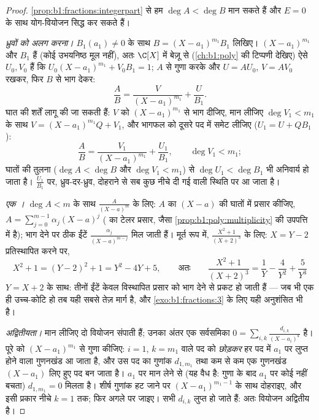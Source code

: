 \begin{proof}
\cref{prop:b1:fractions:integerpart} से हम $\deg A < \deg B$ मान सकते हैं और
$E = 0$ के साथ योग-वियोजन सिद्ध कर सकते हैं।

\emph{ध्रुवों को अलग करना।} $B_1(a_1) \neq 0$ के साथ $B = (X - a_1)^{m_1}
B_1$ लिखिए।  $(X-a_1)^{m_1}$ और $B_1$  हैं (कोई उभयनिष्ठ मूल
नहीं), अतः $\C[X]$ में बेज़ू से (\cref{ch:b1:poly} की टिप्पणी देखिए) ऐसे
$U_0, V_0$ हैं कि $U_0 (X-a_1)^{m_1} + V_0 B_1 = 1$; $A$ से गुणा करके और $U
= AU_0$, $V = AV_0$ रखकर, फिर $B$ से भाग देकर:
\[
\frac AB = \frac{V}{(X - a_1)^{m_1}} + \frac{U}{B_1} .
\]
घात की शर्तें लागू की जा सकती हैं: $V$ को $(X-a_1)^{m_1}$ से भाग दीजिए, मान
लीजिए $\deg V_1 < m_1$ के साथ $V = (X-a_1)^{m_1}Q + V_1$, और भागफल को दूसरे
पद में समेट लीजिए ($U_1 = U + QB_1$):
\[
\frac AB = \frac{V_1}{(X - a_1)^{m_1}} + \frac{U_1}{B_1},
\qquad \deg V_1 < m_1 ;
\]
घातों की तुलना ($\deg A < \deg B$ और $\deg V_1 < m_1$) से $\deg U_1 < \deg
B_1$ भी अनिवार्य हो जाता है। $\frac{U_1}{B_1}$ पर, ध्रुव-दर-ध्रुव, दोहराने
से सब कुछ नीचे दी गई  वाली स्थिति पर आ जाता है।

\emph{एक ।} $\deg A < m$ के साथ $\frac{A}{(X-a)^m}$ के लिए: $A$ का $(X
- a)$ की घातों में प्रसार कीजिए, $A = \sum_{j=0}^{m-1} \alpha_j (X - a)^j$
( का टेलर प्रसार, जैसा \cref{prop:b1:poly:multiplicity} की उपपत्ति में
है); भाग देने पर ठीक ईंटें $\frac{\alpha_j}{(X-a)^{m-j}}$ मिल जाती हैं।
मूर्त रूप में, $\frac{X^2 + 1}{(X+2)^3}$ के लिए: $X = Y - 2$ प्रतिस्थापित
करने पर,
\[
X^2 + 1 = (Y - 2)^2 + 1 = Y^2 - 4Y + 5 ,
\qquad\text{अतः}\qquad
\frac{X^2+1}{(X+2)^3} = \frac1{Y} - \frac4{Y^2} + \frac5{Y^3}
\]
$Y = X + 2$ के साथ: तीनों ईंटें केवल विस्थापित प्रसार को भाग देने से प्रकट
हो जाती हैं --- जब भी एक ही उच्च-कोटि  हो तब यही सबसे तेज़ मार्ग है, और
\cref{exo:b1:fractions:3} के लिए यही अनुशंसित भी है।

\emph{अद्वितीयता।} मान लीजिए दो वियोजन संपाती हैं; उनका अंतर एक सर्वसमिका $0
= \sum_{i,k} \frac{d_{i,k}}{(X - a_i)^k}$ है। पूरे को $(X - a_1)^{m_1}$ से
गुणा कीजिए: $i = 1$, $k = m_1$ वाले पद को \emph{छोड़कर} हर पद में $a_1$ पर
लुप्त होने वाला गुणनखंड आ जाता है, और उस पद का गुणांक $d_{1,m_1}$ तथा कम से
कम एक गुणनखंड $(X - a_1)$ लिए हुए पद बन जाता है। $a_1$ पर मान लेने से (यह
वैध है: गुणा के बाद $a_1$ पर कोई  नहीं बचता) $d_{1,m_1} = 0$ मिलता है।
शीर्ष गुणांक हट जाने पर $(X - a_1)^{m_1 - 1}$ के साथ दोहराइए, और इसी प्रकार
नीचे $k = 1$ तक; फिर अगले  पर जाइए। सभी $d_{i,k}$ लुप्त हो जाते हैं:
अतः वियोजन अद्वितीय है।
\end{proof}

